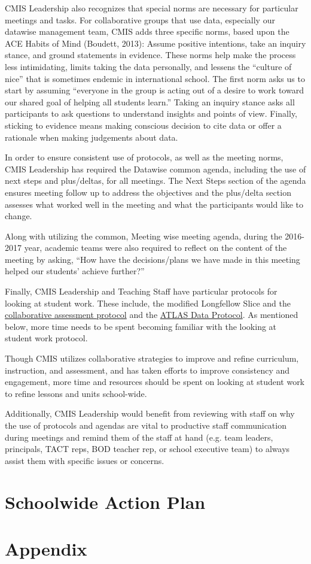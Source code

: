 \documentclass{report}
\begin{document}
\begin{findings}
CMIS Leadership also recognizes that special norms are necessary for particular meetings and tasks. For collaborative groups that use data, especially our datawise management team, CMIS adds three specific norms, based upon the ACE Habits of Mind (Boudett, 2013): Assume positive intentions, take an inquiry stance, and ground statements in evidence. These norms help make the process less intimidating, limits taking the data personally, and lessens the “culture of nice” that is sometimes endemic in international school. The first norm asks us to start by assuming “everyone in the group is acting out of a desire to work toward our shared goal of helping all students learn.” Taking an inquiry stance asks all participants to ask questions to understand insights and points of view. Finally, sticking to evidence means making conscious decision to cite data or offer a rationale when making judgements about data. 

In order to ensure consistent use of protocols, as well as the meeting norms, CMIS Leadership has required the Datawise common agenda, including the use of next steps and plus/deltas, for all meetings. The  Next Steps section of the  agenda ensures meeting follow up to address the objectives and the plus/delta section assesses what worked well in the meeting and what the participants would like to change. 

Along with utilizing the common, Meeting wise meeting agenda, during the 2016-2017 year, academic teams were also required to reflect on the content of the meeting by asking, “How have the decisions/plans we have made in this meeting helped our students’ achieve further?”

Finally, CMIS Leadership and Teaching Staff have particular protocols for looking at student work. These include, the modified Longfellow Slice and the \href{https://docs.google.com/a/cmis.ac.th/document/d/1vC3OD8DgzLVl3_FikEvwSYsbSwEngsDfMOKV6fl7k9M/edit?usp=sharing}{collaborative assessment protocol} and the \href{https://docs.google.com/a/cmis.ac.th/document/d/1cVbpi_Fs4PP7foojiq3we0WA3RK4TuYiI9ConlNRPtI/edit?usp=sharing}{ATLAS Data Protocol}. As mentioned below, more time needs to be spent becoming familiar with the looking at student work protocol. 


Though CMIS utilizes collaborative strategies to improve and refine curriculum, instruction, and assessment, and has taken efforts to improve consistency and engagement, more time and resources should be spent on looking at student work to refine lessons and units school-wide.

Additionally, CMIS Leadership would benefit from reviewing with staff on why the use of protocols and agendas are vital to productive staff communication during meetings and remind them of the staff at hand (e.g. team leaders, principals, TACT reps, BOD teacher rep, or school executive team) to always assist them with specific issues or concerns.
\end{findings}


\chapter{Schoolwide Action Plan}
\chapter{Appendix}
\listoffigures
\listoftables
\end{document}

